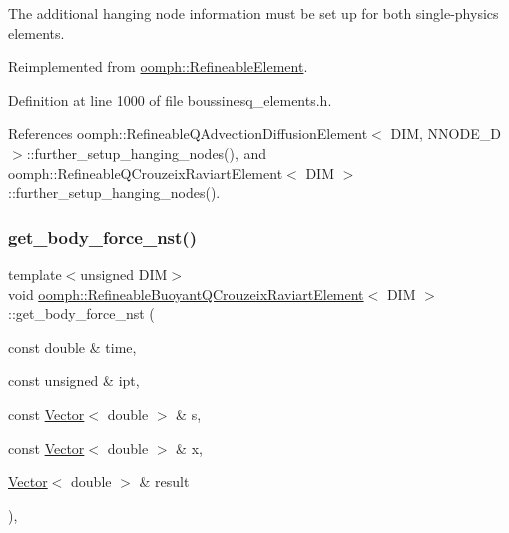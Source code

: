 The additional hanging node information must be set up for both single-\/physics elements. 



Reimplemented from \hyperlink{classoomph_1_1RefineableElement_a86ea01c485f7ff822dce74b884312ccb}{oomph\+::\+Refineable\+Element}.



Definition at line 1000 of file boussinesq\+\_\+elements.\+h.



References oomph\+::\+Refineable\+Q\+Advection\+Diffusion\+Element$<$ D\+I\+M, N\+N\+O\+D\+E\+\_\+D $>$\+::further\+\_\+setup\+\_\+hanging\+\_\+nodes(), and oomph\+::\+Refineable\+Q\+Crouzeix\+Raviart\+Element$<$ D\+I\+M $>$\+::further\+\_\+setup\+\_\+hanging\+\_\+nodes().

\mbox{\label{classoomph_1_1RefineableBuoyantQCrouzeixRaviartElement_a69fb9113989d692dd55eb1983cdbc93b}} 
\subsubsection{\texorpdfstring{get\+\_\+body\+\_\+force\+\_\+nst()}{get\_body\_force\_nst()}}
{\footnotesize\ttfamily template$<$unsigned D\+IM$>$ \\
void \hyperlink{classoomph_1_1RefineableBuoyantQCrouzeixRaviartElement}{oomph\+::\+Refineable\+Buoyant\+Q\+Crouzeix\+Raviart\+Element}$<$ D\+IM $>$\+::get\+\_\+body\+\_\+force\+\_\+nst (\begin{DoxyParamCaption}\item[{const double \&}]{time,  }\item[{const unsigned \&}]{ipt,  }\item[{const \hyperlink{classoomph_1_1Vector}{Vector}$<$ double $>$ \&}]{s,  }\item[{const \hyperlink{classoomph_1_1Vector}{Vector}$<$ double $>$ \&}]{x,  }\item[{\hyperlink{classoomph_1_1Vector}{Vector}$<$ double $>$ \&}]{result }\end{DoxyParamCaption})\hspace{0.3cm}{\ttfamily [inline]}, {\ttfamily [virtual]}}



